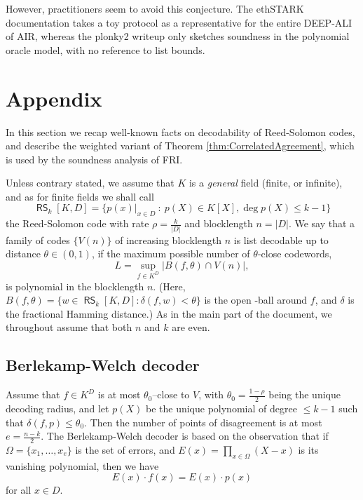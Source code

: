 \documentclass[11pt,article,oneside]{memoir}
\theoremstyle{definition}
\theoremstyle{remark}
\DeclareMathOperator{\RS}{\mathsf{RS}}
\begin{document}
However, practitioners seem to avoid this conjecture. 
The ethSTARK documentation \cite{ethSTARK} takes a toy protocol as a representative for the entire DEEP-ALI of AIR,  whereas the plonky2 writeup \cite{PolygonZero} only sketches soundness in the polynomial oracle model, with no reference to list bounds.






\appendix
\newpage
\chapter{Appendix}
\label{s:Appendix}

In this section we recap well-known facts on decodability of Reed-Solomon codes\footnotemark, and describe the weighted variant of Theorem \ref{thm:CorrelatedAgreement}, which is used by the soundness analysis of FRI.

Unless contrary stated, we assume that $K$ is a \textit{general} field (finite, or infinite), and as for finite fields we shall call
\[ 
\RS_k[K,D]=\big\{p(x)|_{x\in D} \: :\: p(X)\in K[X], \deg p(X)\leq k-1 \big\}
\]
the Reed-Solomon code with rate $\rho=\frac{k}{|D|}$ and blocklength $n=|D|$. 
We say that a family of codes $\{V(n)\}$ of increasing blocklength $n$ is list decodable up to distance $\theta\in (0,1)$, if the maximum possible number of $\theta$-close codewords,
\[
L = \sup_{f\in K^D} \big| B(f,\theta)\cap V(n) \big|,
\]
is polynomial in the blocklength $n$. 
(Here,  $B(f,\theta)= \{w\in \RS_k[K,D] : \delta(f,w)< \theta\}$
 is the open -ball around $f$, and $\delta$ is the fractional Hamming distance.)   
As in the main part of the document, we throughout assume that both $n$ and $k$ are even.

\section{Berlekamp-Welch decoder}

Assume that  $f\in K^D$ is at most $\theta_0$--close to $V$, with
$\theta_0 = \frac{1-\rho}{2}$ being the unique decoding radius, 
and let $p(X)$ be the unique polynomial of degree $\leq k-1$ such that $\delta(f,p) \leq \theta_0$. 
Then the number of points of disagreement is at most $e=\frac{n-k}{2}$. 
The Berlekamp-Welch decoder \cite{BerlekampWelch} is based on the observation that if $\Omega =\{x_1,\ldots,x_e\}$ is the set of errors, and $E(x)=\prod_{x\in\Omega} (X-x)$ is its vanishing polynomial, then we have 
\[
E(x)\cdot f(x) = E(x)\cdot p(x)
\]
for all $x\in D$.
\end{document}
